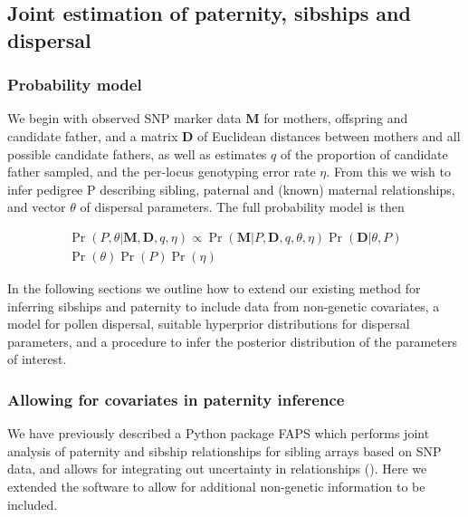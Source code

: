 \documentclass[10pt, a4paper, twocolumn]{article} %
\begin{document}
\subsection{Joint estimation of paternity, sibships and dispersal}

\subsubsection{Probability model}

We begin with observed SNP marker data \textbf{M} for mothers, offspring and candidate father, and a matrix \textbf{D} of Euclidean distances between mothers and all possible candidate fathers, as well as estimates $q$ of the proportion of candidate father sampled, and the per-locus genotyping error rate $\eta$. From this we wish to infer pedigree P describing sibling, paternal and (known) maternal relationships, and vector $\theta$ of dispersal parameters. The full probability model is then

\begin{equation}
\label{eqn:probability_model}
\begin{split}
\Pr( P, \theta | \textbf{M}, \textbf{D}, q, \eta) \propto \Pr(\textbf{M} | P, \textbf{D}, q,\theta, \eta)
\Pr(\textbf{D} | \theta, P) \\
\Pr(\theta) \Pr(P) \Pr(\eta)
\end{split}
\end{equation}

In the following sections we outline how to extend our existing method for inferring sibships and paternity to include data from non-genetic covariates, a model for pollen dispersal, suitable hyperprior distributions for dispersal parameters, and a procedure to infer the posterior distribution of the parameters of interest.

\subsubsection{Allowing for covariates in paternity inference}

We have previously described a Python package FAPS which performs joint analysis of paternity and sibship relationships for sibling arrays based on SNP data, and allows for integrating out uncertainty in relationships (\cite{ellis2018efficient}). Here we extended the software to allow for additional non-genetic information to be included.
\end{document}
